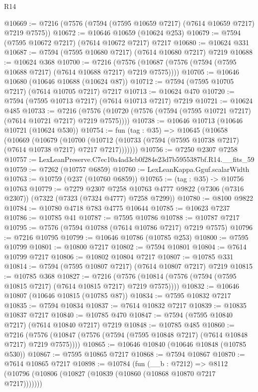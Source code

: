 \begin{lexlean}{R14}
\begin{coremodule}
@10669 := @7216 (@7576 (@7594 (@7595 @10659 @7217) (@7614 @10659 @7217) @7219 @7575))
@10672 := @10646 @10659 (@10624 @253)
@10679 := @7594 (@7595 @10672 @7217) (@7614 @10672 @7217) @7217
@10680 := @10624 @331
@10687 := @7594 (@7595 @10680 @7217) (@7614 @10680 @7217) @7219
@10688 := @10624 @368
@10700 := @7216
    (@7576 (@10687 (@7576 (@7594 (@7595 @10688 @7217) (@7614 @10688 @7217) @7219 @7575))))
@10705 := @10646 @10680 (@10646 @10688 (@10624 @87))
@10712 := @7594 (@7595 @10705 @7217) (@7614 @10705 @7217) @7217
@10713 := @10624 @470
@10720 := @7594 (@7595 @10713 @7217) (@7614 @10713 @7217) @7219
@10721 := @10624 @485
@10733 := @7216
    (@7576 (@10720 (@7576 (@7594 (@7595 @10721 @7217) (@7614 @10721 @7217) @7219 @7575))))
@10738 := @10646 @10713 (@10646 @10721 (@10624 @530))
@10754 := fun (tag : @35) =>
  @10645
    (@10658
      (@10669
        (@10679
          (@10700
            (@10712 (@10733 (@7594 (@7595 @10738 @7217) (@7614 @10738 @7217) @7217 @7217)))))))
@10756 := @7250 @2307 @7258
@10757 := LexLeanPreserve.C7ec10a4ad3cb0f284e23d7b5955387bf.R14.__fits_59
@10759 := @7262 (@10757 @6859)
@10760 := LexLeanKappa.Gguf.scalarWidth
@10763 := @10759 (@237 (@10760 @6859))
@10765 := (tag : @35) -> @10756 @10763
@10779 := @7279
    @2307
    @7258
    @10763
    @4777
    @9822
    (@7306 (@7316 @2307))
    (@7322 (@7323 (@7324 @4777) @7258 @7299))
@10780 := @8100 @9822
@10784 := @10780 @4718 @783 @4775 @10644
@10785 := @10623 @7237
@10786 := @10785 @41
@10787 := @7595 @10786
@10788 := @10787 @7217
@10795 := @7576 (@7594 @10788 (@7614 @10786 @7217) @7219 @7575)
@10796 := @7216 @10795
@10799 := @10646 @10786 (@10785 @253)
@10800 := @7595 @10799
@10801 := @10800 @7217
@10802 := @7594 @10801
@10804 := @7614 @10799 @7217
@10806 := @10802 @10804 @7217
@10807 := @10785 @331
@10814 := @7594 (@7595 @10807 @7217) (@7614 @10807 @7217) @7219
@10815 := @10785 @368
@10827 := @7216
    (@7576 (@10814 (@7576 (@7594 (@7595 @10815 @7217) (@7614 @10815 @7217) @7219 @7575))))
@10832 := @10646 @10807 (@10646 @10815 (@10785 @87))
@10834 := @7595 @10832 @7217
@10835 := @7594 @10834
@10837 := @7614 @10832 @7217
@10839 := @10835 @10837 @7217
@10840 := @10785 @470
@10847 := @7594 (@7595 @10840 @7217) (@7614 @10840 @7217) @7219
@10848 := @10785 @485
@10860 := @7216
    (@7576 (@10847 (@7576 (@7594 (@7595 @10848 @7217) (@7614 @10848 @7217) @7219 @7575))))
@10865 := @10646 @10840 (@10646 @10848 (@10785 @530))
@10867 := @7595 @10865 @7217
@10868 := @7594 @10867
@10870 := @7614 @10865 @7217
@10898 := @10784
    (fun (__b : @7212) =>
    @8112 (@10796 (@10806 (@10827 (@10839 (@10860 (@10868 @10870 @7217 @7217)))))))

\end{coremodule}
\end{lexlean}
